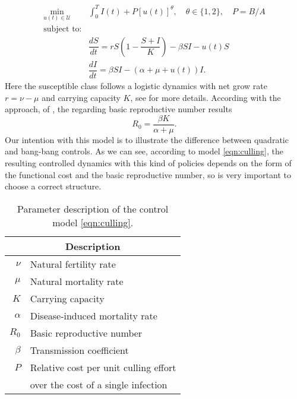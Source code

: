 \begin{equation}\label{eqn:culling}
	\begin{aligned}
  \min_{u(t)\in \mathcal{U}}
    &
    \int_0^T
      I(t) + P [u(t)]^{\theta}, \quad \theta \in \{1,2\},
      \quad P = B/A
  \\ \textrm{subject to:} &
  \\
    &\dfrac{dS}{dt} =
			r S 
			\left (
				1 - \dfrac{S+I}{K}
			\right)
			 - \beta SI - u(t) S
		\\
		&\dfrac{dI}{dt} =
			\beta SI - (\alpha + \mu + u(t)) I.
	\end{aligned}
\end{equation}
%
Here the susceptible class follows a logistic dynamics with net grow rate
$r = \nu - \mu$ and carrying capacity $K$, see 
for more details. According with the approach, 
of \citet{VandenDriessche2017}, the regarding basic reproductive number results
$$
  R_0 = \frac{\beta K}{\alpha + \mu}.
$$ 
  Our intention with this model is to illustrate the difference between
quadratic and bang-bang controls. As we can see, according to model 
\eqref{eqn:culling}, the resulting controlled dynamics with this kind of 
policies depends on the form of the functional cost and the basic reproductive 
number, so is very important to choose a correct structure.
\begin{table}
  \begin{center}
    \begin{tabular}{@{}rl@{}}
        \toprule
      \multicolumn{2}{c}{\bf{Description}}
      \\
      \midrule
      $\nu$
        &
          Natural fertility rate
      \\
      $\mu$
        & Natural mortality rate
      \\
      $K$
        & Carrying capacity
      \\
      $\alpha$
        & Disease-induced mortality rate
      \\
      $R_0$
        & Basic reproductive number
      \\
      $\beta$
        & Transmission coefficient
      \\
      $P$
        & Relative cost per unit culling effort \\
        & over the cost of a single infection
      \\
      \bottomrule
    \end{tabular}
  \end{center}
  \caption{Parameter description of the control model \eqref{eqn:culling}.}
  \label{tbl:culling_parameter_des}
\end{table}
